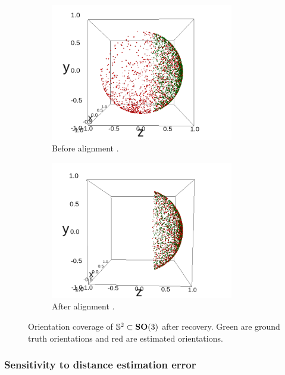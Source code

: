 \begin{figure}
    \centering
    \begin{subfigure}[b]{0.45\textwidth}
        \includegraphics[height=6cm]{images/coverage_alignment_before.png}
        \caption{Before alignment .}
    \end{subfigure}
    \hfill
    \begin{subfigure}[b]{0.50\textwidth}
    \centering
        \includegraphics[height=6cm]{images/coverage_alignment_after.png}
        \caption{After alignment .}
    \end{subfigure}
    \caption{
        Orientation coverage of $\mathbb{S}^2 \subset \mathrm{\mathbf{SO}}(3)$ after recovery.
        Green are ground truth orientations and red are estimated orientations.
}
    \label{fig:5j0n-aa-loss-perfect-distances}
\end{figure}


\subsubsection{Sensitivity to distance estimation error}\label{sec:results:orientation-recovery:sensitivity}

